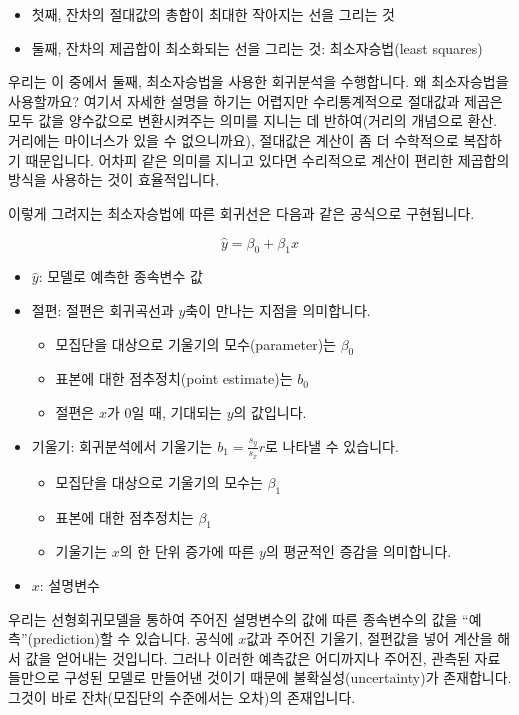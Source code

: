 \documentclass[]{book}
\providecommand{\tightlist}{%
  \setlength{\itemsep}{0pt}\setlength{\parskip}{0pt}}
\begin{document}
\begin{itemize}
\item
  첫째, 잔차의 절대값의 총합이 최대한 작아지는 선을 그리는 것
\item
  둘째, 잔차의 제곱합이 최소화되는 선을 그리는 것: 최소자승법(least squares)
\end{itemize}

우리는 이 중에서 둘째, 최소자승법을 사용한 회귀분석을 수행합니다. 왜 최소자승법을 사용할까요? 여기서 자세한 설명을 하기는 어렵지만 수리통계적으로 절대값과 제곱은 모두 값을 양수값으로 변환시켜주는 의미를 지니는 데 반하여(거리의 개념으로 환산. 거리에는 마이너스가 있을 수 없으니까요), 절대값은 계산이 좀 더 수학적으로 복잡하기 때문입니다. 어차피 같은 의미를 지니고 있다면 수리적으로 계산이 편리한 제곱합의 방식을 사용하는 것이 효율적입니다.

이렇게 그려지는 최소자승법에 따른 회귀선은 다음과 같은 공식으로 구현됩니다.

\[ \hat{y} = \beta_0 + \beta_1x\]

\begin{itemize}
\item
  \(\hat{y}\): 모델로 예측한 종속변수 값
\item
  절편: 절편은 회귀곡선과 \(y\)축이 만나는 지점을 의미합니다.

  \begin{itemize}
  \tightlist
  \item
    모집단을 대상으로 기울기의 모수(parameter)는 \(\beta_0\)
  \item
    표본에 대한 점추정치(point estimate)는 \(b_0\)
  \item
    절편은 \(x\)가 0일 때, 기대되는 \(y\)의 값입니다.
  \end{itemize}
\item
  기울기: 회귀분석에서 기울기는 \(b_1 = \frac{s_y}{s_x}r\)로 나타낼 수 있습니다.

  \begin{itemize}
  \tightlist
  \item
    모집단을 대상으로 기울기의 모수는 \(\beta_1\)
  \item
    표본에 대한 점추정치는 \(\beta_1\)
  \item
    기울기는 \(x\)의 한 단위 증가에 따른 \(y\)의 평균적인 증감을 의미합니다.
  \end{itemize}
\item
  \(x\): 설명변수
\end{itemize}

우리는 선형회귀모델을 통하여 주어진 설명변수의 값에 따른 종속변수의 값을 ``예측''(prediction)할 수 있습니다. 공식에 \(x\)값과 주어진 기울기, 절편값을 넣어 계산을 해서 값을 얻어내는 것입니다. 그러나 이러한 예측값은 어디까지나 주어진, 관측된 자료들만으로 구성된 모델로 만들어낸 것이기 때문에 불확실성(uncertainty)가 존재합니다. 그것이 바로 잔차(모집단의 수준에서는 오차)의 존재입니다.
\end{document}
